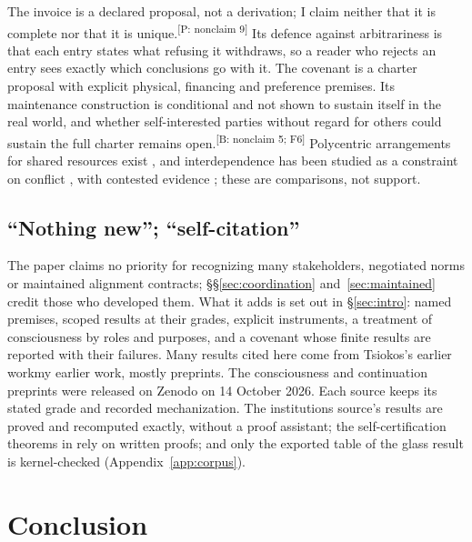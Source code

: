 \documentclass[pdflatex,sn-basic]{sn-jnl}%
\newcommand{\slot}[1]{}%
\newcommand{\claim}[2]{\ifannotated\textsuperscript{\textcolor{blue!60!black}{\tiny[#1: #2]}}\fi}
\newcommand{\enquote}[1]{``#1''}
\newcommand{\renderchoice}[2]{\ifanonymous#2\else#1\fi}%
\begin{document}
\slot{10.4}
The invoice is a declared proposal, not a derivation; I claim neither that it is complete nor that it is unique.\claim{P}{nonclaim 9} Its defence against arbitrariness is that each entry states what refusing it withdraws, so a reader who rejects an entry sees exactly which conclusions go with it. The covenant is a charter proposal with explicit physical, financing and preference premises. Its maintenance construction is conditional and not shown to sustain itself in the real world, and whether self-interested parties without regard for others could sustain the full charter remains open.\claim{B}{nonclaim 5; F6} Polycentric arrangements for shared resources exist \citep{ostrom1990}, and interdependence has been studied as a constraint on conflict \citep{keohane1977}, with contested evidence \citep{oneal1999}; these are comparisons, not support.

\subsection{\enquote{Nothing new}; \enquote{self-citation}}

\slot{10.5}
The paper claims no priority for recognizing many stakeholders, negotiated norms or maintained alignment contracts; \S\S\ref{sec:coordination} and~\ref{sec:maintained} credit those who developed them. What it adds is set out in \S\ref{sec:intro}: named premises, scoped results at their grades, explicit instruments, a treatment of consciousness by roles and purposes, and a covenant whose finite results are reported with their failures. Many results cited here come from \renderchoice{my earlier work}{Tsiokos's earlier work}, mostly preprints. The consciousness and continuation preprints were released on Zenodo on 14 October 2026. Each source keeps its stated grade and recorded mechanization. The institutions source's results are proved and recomputed exactly, without a proof assistant; the self-certification theorems in \citet{tsiokos2026f3} rely on written proofs; and only the exported table of the glass result \citep{tsiokos2026glass} is kernel-checked (Appendix~\ref{app:corpus}).

\section{Conclusion}\label{sec:conclusion}
\end{document}
